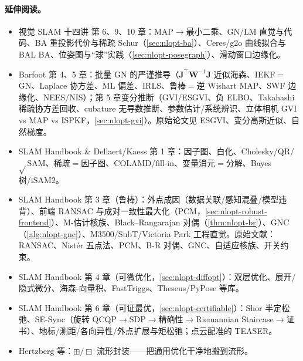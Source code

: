 \paragraph{延伸阅读。}
\begin{itemize}
  \item 视觉 SLAM 十四讲\cite{gaoxiang2019slam14} 第 6、9、10 章：MAP$\to$最小二乘、GN/LM 直觉与代码、BA 重投影代价与稀疏 Schur（\cref{sec:nlopt-ba}）、Ceres/g2o 曲线拟合与 BAL BA、位姿图与“球”实践（\cref{sec:nlopt-posegraph}）、滑动窗口边缘化。
  \item Barfoot\cite{barfoot2024state} 第 4、5 章：批量 GN 的严谨推导（$\mathbf{J}^\top\mathbf{W}^{-1}\mathbf{J}$ 近似海森、IEKF$=$GN、Laplace 协方差、ML 偏差、IRLS、鲁棒$=$逆 Wishart MAP、SWF 边缘化、NEES/NIS）；第 5 章变分推断（GVI/ESGVI、负 ELBO、Takahashi 稀疏协方差回收、cubature 无导数推断、参数估计/系统辨识、立体相机 GVI vs MAP vs ISPKF，\cref{sec:nlopt-gvi}）。原始论文见 ESGVI\cite{barfoot2020esgvi}、变分高斯近似\cite{opper2009variational}、自然梯度\cite{amari1998natural}。
  \item SLAM Handbook\cite{carlone2026handbook} \& Dellaert/Kaess\cite{dellaert2017factor} 第 1 章：因子图、白化、Cholesky/QR/$\sqrt{}$SAM、稀疏$=$因子图、COLAMD/fill-in、变量消元$=$分解、Bayes 树/iSAM2。
  \item SLAM Handbook\cite{carlone2026handbook} 第 3 章（鲁棒）：外点成因（数据关联/感知混叠/模型违背）、前端 RANSAC 与成对一致性最大化（PCM，\cref{sec:nlopt-robust-frontend}）、M-估计核族、Black--Rangarajan 对偶（\cref{thm:nlopt-br}）、GNC（\cref{alg:nlopt-gnc}）、M3500/SubT/Victoria Park 工程直觉。原始文献：RANSAC\cite{fischler1981ransac}、Nistér 五点法\cite{nister2004fivepoint}、PCM\cite{mangelson2018pcm}、B-R 对偶\cite{black1996rangarajan}、GNC\cite{yang2020gnc}、自适应核族\cite{barron2019general}、开关约束\cite{sunderhauf2012switchable}。
  \item SLAM Handbook\cite{carlone2026handbook} 第 4 章（可微优化，\cref{sec:nlopt-diffopt}）：双层优化、展开/隐式微分、海森-向量积、FastTriggs、Theseus/PyPose 等库。
  \item SLAM Handbook\cite{carlone2026handbook} 第 6 章（可证最优，\cref{sec:nlopt-certifiable}）：Shor 半定松弛、SE-Sync\cite{rosen2019sesync}（旋转 QCQP$\to$SDP$\to$精确性$\to$Riemannian Staircase$\to$证书）、地标/测距/各向异性/外点扩展与矩松弛；点云配准的 TEASER\cite{yang2021teaser}。
  \item Hertzberg 等\cite{hertzberg2013integrating}：$\boxplus/\boxminus$ 流形封装——把通用优化干净地搬到流形。
\end{itemize}

